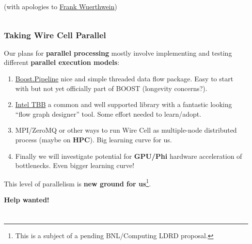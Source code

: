 \documentclass[xcolor=dvipsnames]{beamer}
\begin{document}
\begin{frame}
\begin{columns}
\begin{column}{0.30\textwidth}
\begin{center}
        \scriptsize (with apologies to \href{https://www.bnl.gov/events/details.php?q=11000}{Frank Wuerthwein})
      \end{center}
    \end{column}
  \end{columns}

\end{frame}

\begin{frame}
  \frametitle{Taking Wire Cell Parallel}

  Our plans for \textbf{parallel processing} mostly involve
  implementing and testing different \textbf{parallel execution models}:

  \begin{enumerate}\footnotesize
  \item \href{https://github.com/erenon/pipeline}{Boost.Pipeline} nice
    and simple threaded data flow package.  Easy to start with but not
    yet officially part of BOOST (longevity concerns?).
  \item \href{https://www.threadingbuildingblocks.org/}{Intel TBB} a
    common and well supported library with a fantastic looking ``flow
    graph designer'' tool.  Some effort needed to learn/adopt.
  \item MPI/ZeroMQ or other ways to run Wire Cell as multiple-node
    distributed process (maybe on \textbf{HPC}).  Big learning curve
    for us.
  \item Finally we will investigate potential for \textbf{GPU/Phi} hardware
    acceleration of bottlenecks. Even bigger learning curve!
  \end{enumerate}

  \vfill

  This level of parallelism is \textbf{new ground for us}\footnote{This is a subject of a pending BNL/Computing LDRD proposal.}.

  \vfill

  \textbf{Help wanted!}
\end{frame}


\section{}
\end{document}
